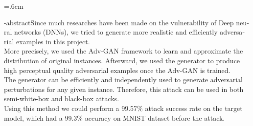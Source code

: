 
\baselineskip=.6cm
\begin{latin}
	
	\en-abstract{Since much researches have been made on the vulnerability of Deep neural networks (DNNs), we tried to generate more realistic and efficiently adversarial examples in this project.
		\\
		More precisely, we used the Adv-GAN framework to learn and approximate the distribution of original instances. Afterward, we used the generator to produce high perceptual quality adversarial examples once the Adv-GAN is trained. 
		\\
		The generator can be efficiently and independently used to generate adversarial perturbations for any given instance. Therefore, this attack can be used in both semi-white-box and black-box attacks.
		\\
		Using this method we could perform a 99.57\% attack success rate on the target model, which had a 99.3\% accuracy on MNIST dataset before the attack. 
	}
	\latinfirstPage
\end{latin}
